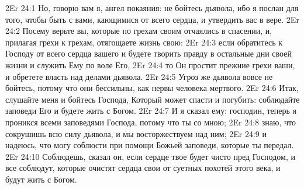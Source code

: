 \vs 2Er 24:1
Но, говорю вам я, ангел
покаяния: не бойтесь дьявола, ибо я послан для того, чтобы быть с вами,
кающимися от всего сердца, и утвердить вас в вере.
\vs 2Er 24:2
Посему верьте вы, которые
по грехам своим отчаялись в спасении, и, прилагая грехи к грехам, отягощаете
жизнь свою:
\vs 2Er 24:3
если обратитесь к Господу
от всего сердца вашего и будете творить правду в остальные дни своей жизни и
служить Ему по воле Его,
\vs 2Er 24:4
то Он простит прежние
грехи ваши, и обретете власть над делами дьявола.
\vs 2Er 24:5
Угроз же дьявола вовсе не
бойтесь, потому что они бессильны, как нервы человека мертвого.
\vs 2Er 24:6
Итак, слушайте меня и
бойтесь Господа, Который может спасти и погубить: соблюдайте заповеди Его и
будете жить с Богом.
\vs 2Er 24:7
И я сказал ему: господин,
теперь я проникся всеми заповедями Господа, потому что ты со мною;
\vs 2Er 24:8
знаю, что сокрушишь всю
силу дьявола, и мы восторжествуем над ним;
\vs 2Er 24:9
и надеюсь, что могу
соблюсти при помощи Божьей заповеди, которые ты передал.
\vs 2Er 24:10
Соблюдешь, сказал он,
если сердце твое будет чисто пред Господом, и все соблюдут, которые очистят
сердца свои от суетных похотей этого века, и будут жить с Богом.
